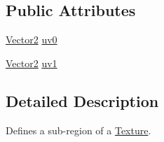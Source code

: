 \subsection*{Public Attributes}
\begin{DoxyCompactItemize}
\item 
\hyperlink{class_vector2}{Vector2} \hyperlink{class_texture_region_a5cc46b970a98f4914a1a02f5e8fc74a9}{uv0}
\item 
\hyperlink{class_vector2}{Vector2} \hyperlink{class_texture_region_a33813851075ba1209a289d6b6be4004a}{uv1}
\end{DoxyCompactItemize}


\subsection{Detailed Description}
Defines a sub-\/region of a \hyperlink{class_texture}{Texture}. 

